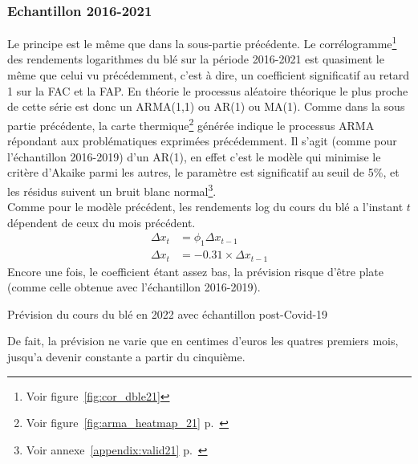 \subsubsection{Echantillon 2016-2021}
Le principe est le même que dans la sous-partie précédente. Le corrélogramme\footnote{Voir figure~\ref{fig:cor_dble21}} des rendements logarithmes du blé sur la période
2016-2021 est quasiment le même que celui vu précédemment, c'est à dire, un coefficient significatif au retard 1 sur la FAC et la FAP. En théorie le processus aléatoire 
théorique le plus proche de cette série est donc un ARMA(1,1) ou AR(1) ou MA(1). Comme dans la sous partie précédente, la carte 
thermique\footnote{Voir figure~\ref{fig:arma_heatmap_21} p.~\pageref{fig:arma_heatmap_21}} générée indique le processus ARMA répondant aux problématiques exprimées 
précédemment. Il s'agit (comme pour l'échantillon 2016-2019) d'un AR(1), en effet c'est le modèle qui minimise le critère d'Akaike parmi les autres, le paramètre est
significatif au seuil de 5\%, et les résidus suivent un bruit blanc normal\footnote{Voir annexe~\ref{appendix:valid21} p.~\pageref{appendix:valid21}}.\\[11pt]
Comme pour le modèle précédent, les rendements log du cours du blé a l'instant $t$ dépendent de ceux du mois précédent.
\begin{equation*}
    \begin{split}
        \Delta x_{t} &= \phi_{1} \Delta x_{t-1} \\
        \Delta x_{t} &=-0.31 \times \Delta x_{t-1}
    \end{split}
\end{equation*}
Encore une fois, le coefficient étant assez bas, la prévision risque d'être plate (comme celle obtenue avec l'échantillon 2016-2019).
\begin{table}[H]
    \centering
    \caption{Prévision du cours du blé en 2022 avec échantillon post-Covid-19}
    \sffamily
    
\end{table}
De fait, la prévision ne varie que en centimes d'euros les quatres premiers mois, jusqu'a devenir constante a partir du cinquième.
